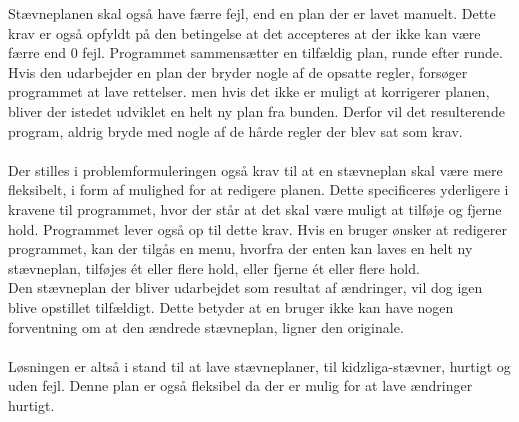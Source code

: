 Stævneplanen skal også have færre fejl, end en plan der er lavet manuelt. Dette krav er også opfyldt på den betingelse at det accepteres at der ikke kan være færre end 0 fejl.
Programmet sammensætter en tilfældig plan, runde efter runde. Hvis den udarbejder en plan der bryder nogle af de opsatte regler, forsøger programmet at lave rettelser. men hvis det ikke er muligt at korrigerer planen, bliver der istedet udviklet en helt ny plan fra bunden. Derfor vil det resulterende program, aldrig bryde med nogle af de hårde regler der blev sat som krav. 
\\\\
Der stilles i problemformuleringen også krav til at en stævneplan skal være mere fleksibelt, i form af mulighed for at redigere planen. Dette specificeres yderligere i kravene til programmet, hvor der står at det skal være muligt at tilføje og fjerne hold.
Programmet lever også op til dette krav. Hvis en bruger ønsker at redigerer programmet, kan der tilgås en menu, hvorfra der enten kan laves en helt ny stævneplan, tilføjes ét eller flere hold, eller fjerne ét eller flere hold. 
\\
Den stævneplan der bliver udarbejdet som resultat af ændringer, vil dog igen blive opstillet tilfældigt. Dette betyder at en bruger ikke kan have nogen forventning om at den ændrede stævneplan, ligner den originale.
\\\\
Løsningen er altså i stand til at lave stævneplaner, til kidzliga-stævner, hurtigt og uden fejl. Denne plan er også fleksibel da der er mulig for at lave ændringer hurtigt.
